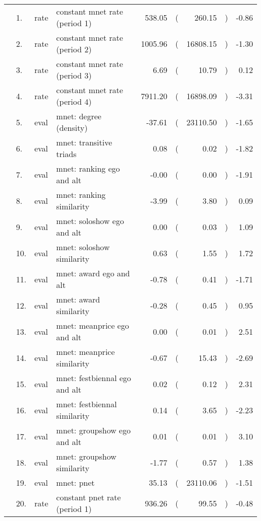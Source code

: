 \begin{table}[ht]
\centering
\begin{tabular}{llllrlrlr}
  \hline
  \hline
  &  1. & rate & constant mnet rate (period 1) & 538.05 & ( & 260.15 & ) & -0.86 \\ 
    &  2. & rate & constant mnet rate (period 2) & 1005.96 & ( & 16808.15 & ) & -1.30 \\ 
    &  3. & rate & constant mnet rate (period 3) & 6.69 & ( & 10.79 & ) & 0.12 \\ 
    &  4. & rate & constant mnet rate (period 4) & 7911.20 & ( & 16898.09 & ) & -3.31 \\ 
    &  5. & eval & mnet: degree (density) & -37.61 & ( & 23110.50 & ) & -1.65 \\ 
    &  6. & eval & mnet: transitive triads & 0.08 & ( & 0.02 & ) & -1.82 \\ 
    &  7. & eval & mnet: ranking ego and alt & -0.00 & ( & 0.00 & ) & -1.91 \\ 
    &  8. & eval & mnet: ranking similarity & -3.99 & ( & 3.80 & ) & 0.09 \\ 
    &  9. & eval & mnet: soloshow ego and alt & 0.00 & ( & 0.03 & ) & 1.09 \\ 
    & 10. & eval & mnet: soloshow similarity & 0.63 & ( & 1.55 & ) & 1.72 \\ 
    & 11. & eval & mnet: award ego and alt & -0.78 & ( & 0.41 & ) & -1.71 \\ 
    & 12. & eval & mnet: award similarity & -0.28 & ( & 0.45 & ) & 0.95 \\ 
    & 13. & eval & mnet: meanprice ego and alt & 0.00 & ( & 0.01 & ) & 2.51 \\ 
    & 14. & eval & mnet: meanprice similarity & -0.67 & ( & 15.43 & ) & -2.69 \\ 
    & 15. & eval & mnet: festbiennal ego and alt & 0.02 & ( & 0.12 & ) & 2.31 \\ 
    & 16. & eval & mnet: festbiennal similarity & 0.14 & ( & 3.65 & ) & -2.23 \\ 
    & 17. & eval & mnet: groupshow ego and alt & 0.01 & ( & 0.01 & ) & 3.10 \\ 
    & 18. & eval & mnet: groupshow similarity & -1.77 & ( & 0.57 & ) & 1.38 \\ 
    & 19. & eval & mnet: pnet & 35.13 & ( & 23110.06 & ) & -1.51 \\ 
    & 20. & rate & constant pnet rate (period 1) & 936.26 & ( & 99.55 & ) & -0.48 \\ 

\end{tabular}
\end{table}
